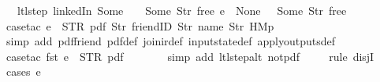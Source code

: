 \begin{isabellebody}
\ \ \ ltl{\isacharunderscore}step\ linkedIn\ {\isacharparenleft}Some\ {}{\isacharparenright}\ {\isacharparenleft}{\isacharless}{\isachargreater}{\isacharparenleft}{}\ {\isachardollar}{\isacharcolon}{\isacharequal}\ Some\ {\isacharparenleft}Str\ {\isacharprime}{\isacharprime}free{\isacharprime}{\isacharprime}{\isacharparenright}{\isacharparenright}{\isacharparenright}\ e\ {\isacharequal}\ {\isacharparenleft}None{\isacharcomma}\ {\isacharbrackleft}{\isacharbrackright}{\isacharcomma}{\isacharparenleft}{\isacharless}{\isachargreater}{\isacharparenleft}{}\ {\isachardollar}{\isacharcolon}{\isacharequal}\ Some\ {\isacharparenleft}Str\ {\isacharprime}{\isacharprime}free{\isacharprime}{\isacharprime}{\isacharparenright}{\isacharparenright}{\isacharparenright}{\isacharparenright}{\isachardoublequoteclose}\isanewline
%
\isadelimproof
\ \ %
\endisadelimproof
%
\isatagproof
{}\isamarkupfalse%
\ {\isacharparenleft}case{\isacharunderscore}tac\ {\isachardoublequoteopen}e\ {\isacharequal}\ {\isacharparenleft}STR\ {\isacharprime}{\isacharprime}pdf{\isacharprime}{\isacharprime}{\isacharcomma}\ {\isacharbrackleft}Str\ {\isacharprime}{\isacharprime}friendID{\isacharprime}{\isacharprime}{\isacharcomma}\ Str\ {\isacharprime}{\isacharprime}name{\isacharprime}{\isacharprime}{\isacharcomma}\ Str\ {\isacharprime}{\isacharprime}HM{}p{\isacharprime}{\isacharprime}{\isacharbrackright}{\isacharparenright}{\isachardoublequoteclose}{\isacharparenright}\isanewline
\ \ \ \isamarkupfalse%
\ {\isacharparenleft}simp\ add{\isacharcolon}\ pdf{\isacharunderscore}friend\ pdf{\isacharunderscore}def\ join{\isacharunderscore}ir{\isacharunderscore}def\ input{}state{\isacharunderscore}def\ apply{\isacharunderscore}outputs{\isacharunderscore}def{\isacharparenright}\isanewline
\ \ \isamarkupfalse%
\ {\isacharparenleft}case{\isacharunderscore}tac\ {\isachardoublequoteopen}fst\ e\ {\isacharequal}\ STR\ {\isacharprime}{\isacharprime}pdf{\isacharprime}{\isacharprime}{\isachardoublequoteclose}{\isacharparenright}\isanewline
\ \ \ \ \isamarkupfalse%
\ \isamarkupfalse%
\ {\isacharparenleft}simp\ add{\isacharcolon}\ ltl{\isacharunderscore}step{\isacharunderscore}alt\ not{\isacharunderscore}pdf{\isacharunderscore}{}{\isacharparenright}\isanewline
\ \ \ \isamarkupfalse%
\ {\isacharparenleft}rule\ disjI{}{\isacharparenright}\isanewline
\ \ \ \isamarkupfalse%
\ {\isacharparenleft}cases\ e{\isacharparenright}\isanewline

\end{isabellebody}
